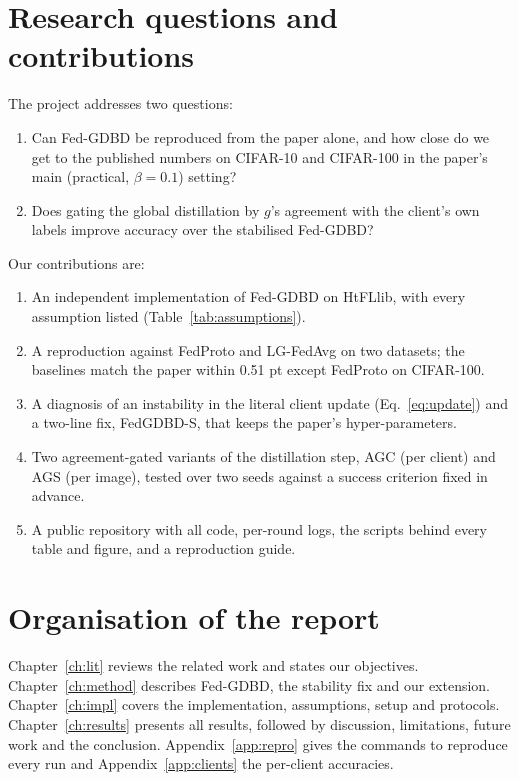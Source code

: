 \section{Research questions and contributions}

The project addresses two questions:
\begin{enumerate}
\item Can Fed-GDBD be reproduced from the paper alone, and how close do we get to the published numbers on CIFAR-10 and CIFAR-100 in the paper's main (practical, $\beta=0.1$) setting?
\item Does gating the global distillation by $g$'s agreement with the client's own labels improve accuracy over the stabilised Fed-GDBD?
\end{enumerate}

Our contributions are:
\begin{enumerate}
\item An independent implementation of Fed-GDBD on HtFLlib, with every assumption listed (Table~\ref{tab:assumptions}).
\item A reproduction against FedProto and LG-FedAvg on two datasets; the baselines match the paper within 0.51 pt except FedProto on CIFAR-100.
\item A diagnosis of an instability in the literal client update (Eq.~\ref{eq:update}) and a two-line fix, FedGDBD-S, that keeps the paper's hyper-parameters.
\item Two agreement-gated variants of the distillation step, AGC (per client) and AGS (per image), tested over two seeds against a success criterion fixed in advance.
\item A public repository with all code, per-round logs, the scripts behind every table and figure, and a reproduction guide.
\end{enumerate}

\section{Organisation of the report}

Chapter~\ref{ch:lit} reviews the related work and states our objectives. Chapter~\ref{ch:method} describes Fed-GDBD, the stability fix and our extension. Chapter~\ref{ch:impl} covers the implementation, assumptions, setup and protocols. Chapter~\ref{ch:results} presents all results, followed by discussion, limitations, future work and the conclusion. Appendix~\ref{app:repro} gives the commands to reproduce every run and Appendix~\ref{app:clients} the per-client accuracies.
